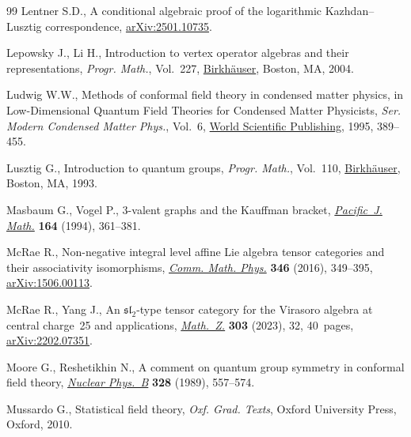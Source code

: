 \begin{thebibliography}{99}
Lentner S.D., A conditional algebraic proof of the logarithmic
 {K}azhdan--{L}usztig correspondence,
 \href{http://arxiv.org/abs/2501.10735}{arXiv:2501.10735}.

Lepowsky J., Li H., Introduction to vertex operator algebras and their
 representations, \textit{Progr. Math.}, Vol.~227,
 \href{https://doi.org/10.1007/978-0-8176-8186-9}{Birkh\"auser}, Boston, MA,
 2004.

Ludwig W.W., Methods of conformal field theory in condensed matter physics, in
 Low-{D}imensional {Q}uantum {F}ield {T}heories for {C}ondensed {M}atter
 {P}hysicists, \textit{Ser. Modern Condensed Matter Phys.}, Vol.~6,
 \href{https://doi.org/10.1142/9789814447027_0007}{World Scientific
 Publishing}, 1995, 389--455.

Lusztig G., Introduction to quantum groups, \textit{Progr. Math.}, Vol.~110,
 \href{https://doi.org/10.1007/978-3-031-23817-8}{Birkh\"auser}, Boston, MA,
 1993.

Masbaum G., Vogel P., {$3$}-valent graphs and the {K}auffman bracket,
 \href{https://doi.org/10.2140/pjm.1994.164.361}{\textit{Pacific~J. Math.}}
 \textbf{164} (1994), 361--381.

McRae R., Non-negative integral level affine {L}ie algebra tensor categories
 and their associativity isomorphisms,
 \href{https://doi.org/10.1007/s00220-016-2683-y}{\textit{Comm. Math. Phys.}}
 \textbf{346} (2016), 349--395,
 \href{http://arxiv.org/abs/1506.00113}{arXiv:1506.00113}.

McRae R., Yang J., An {$\mathfrak{sl}_2$}-type tensor category for the
 {V}irasoro algebra at central charge~25 and applications,
 \href{https://doi.org/10.1007/s00209-022-03197-z}{\textit{Math.~Z.}}
 \textbf{303} (2023), 32, 40~pages,
 \href{http://arxiv.org/abs/2202.07351}{arXiv:2202.07351}.

Moore G., Reshetikhin N., A comment on quantum group symmetry in conformal
 field theory,
 \href{https://doi.org/10.1016/0550-3213(89)90219-8}{\textit{Nuclear Phys.~B}}
 \textbf{328} (1989), 557--574.

Mussardo G., Statistical field theory, \textit{Oxf. Grad. Texts}, Oxford University
 Press, Oxford, 2010.


\end{thebibliography}
